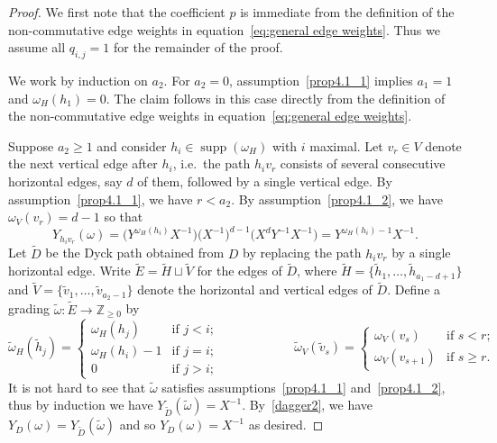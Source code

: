 \documentclass[10pt]{amsart}
\theoremstyle{definition}
\newcommand{\ie}{i.e.\ }
\newcommand{\ZZ}{\mathbb{Z}}
\DeclareMathOperator{\supp}{supp}
\begin{document}
\begin{proof}
 We first note that the coefficient $p$ is immediate from the definition of the non-commutative edge weights in equation~\eqref{eq:general edge weights}. 
 Thus we assume all $q_{i,j}=1$ for the remainder of the proof.

 We work by induction on $a_2$. 
 For $a_2=0$, assumption~\ref{prop4.1_1} implies $a_1=1$ and $\omega_H(h_1)=0$. 
 The claim follows in this case directly from the definition of the non-commutative edge weights in equation~\eqref{eq:general edge weights}.

 Suppose $a_2\ge1$ and consider $h_i\in\supp(\omega_H)$ with $i$ maximal.
 Let $v_r\in V$ denote the next vertical edge after $h_i$, \ie the path $h_iv_r$ consists of several consecutive horizontal edges, say $d$ of them, followed by a single vertical edge.
 By assumption~\ref{prop4.1_1}, we have $r<a_2$.
 By assumption~\ref{prop4.1_2}, we have $\omega_V(v_r)=d-1$ so that 
 \begin{equation}\label{dagger2}
 \tag{$\dagger$}
 Y_{h_iv_r}(\omega)=\big(Y^{\omega_H(h_i)}X^{-1}\big)\big(X^{-1}\big)^{d-1}\big(X^dY^{-1}X^{-1}\big)=Y^{\omega_H(h_i)-1}X^{-1}.
 \end{equation}
 Let $\widetilde D$ be the Dyck path obtained from $D$ by replacing the path $h_iv_r$ by a single horizontal edge.
 Write $\widetilde E=\widetilde H\sqcup\widetilde V$ for the edges of $\widetilde D$, where $\widetilde H=\{\tilde h_1,\ldots,\tilde h_{a_1-d+1}\}$ and $\widetilde V=\{\tilde v_1,\ldots,\tilde v_{a_2-1}\}$ denote the horizontal and vertical edges of $\widetilde D$.
 Define a grading $\widetilde\omega:\widetilde E\to\ZZ_{\ge0}$ by
 \[\widetilde\omega_H(\tilde h_j)=\begin{cases} \omega_H(h_j) & \text{if $j<i$;}\\ \omega_H(h_i)-1 & \text{if $j=i$;}\\ 0 & \text{if $j>i$;}\end{cases}
 \hspace{1in}
 \widetilde\omega_V(\tilde v_s)=\begin{cases} \omega_V(v_s) & \text{if $s<r$;}\\ \omega_V(v_{s+1}) & \text{if $s\ge r$.}\end{cases}\]
 It is not hard to see that $\widetilde\omega$ satisfies assumptions~\ref{prop4.1_1} and~\ref{prop4.1_2}, thus by induction we have $Y_{\widetilde D}(\widetilde\omega)=X^{-1}$.
 By~\eqref{dagger2}, we have $Y_D(\omega)=Y_{\widetilde D}(\widetilde\omega)$ and so $Y_D(\omega)=X^{-1}$ as desired.
\end{proof}
\end{document}
